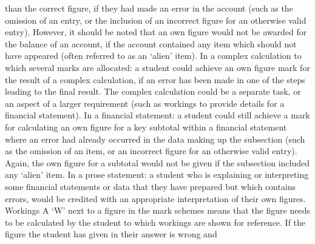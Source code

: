 \documentclass{article}
\begin{document}
than the correct figure, if they had made an error in the account (such as the omission of an entry, or the \newline
inclusion of an incorrect figure for an otherwise valid entry).  However, it should be noted that an own \newline
figure would not be awarded for the balance of an account, if the account contained any item which \newline
should not have appeared (often referred to as an ‘alien’ item).  \newline
 \newline
In a complex calculation to which several marks are allocated: a student could achieve an own figure \newline
mark for the result of a complex calculation, if an error has been made in one of the steps leading to the \newline
final result.  The complex calculation could be a separate task, or an aspect of a larger requirement \newline
(such as workings to provide details for a financial statement).  \newline
 \newline
In a financial statement: a student could still achieve a mark for calculating an own figure for a key \newline
subtotal within a financial statement where an error had already occurred in the data making up the \newline
subsection (such as the omission of an item, or an incorrect figure for an otherwise valid entry).  Again, \newline
the own figure for a subtotal would not be given if the subsection included any ‘alien’ item.  \newline
 \newline
In a prose statement: a student who is explaining or interpreting some financial statements or data that \newline
they have prepared but which contains errors, would be credited with an appropriate interpretation of \newline
their own figures.  \newline
 \newline
Workings  \newline
 \newline
A ‘W’ next to a figure in the mark schemes means that the figure needs to be calculated by the student to \newline
which workings are shown for reference.  If the figure the student has given in their answer is wrong and \newline
\end{document}
